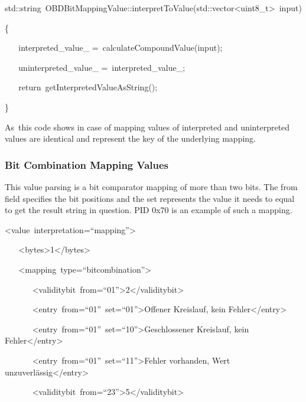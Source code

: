 {std}{::}{string}{~}{OBDBitMappingValue}{::}{interpretToValue}{(}{std}{::}{vector}{\textless{}uint8\_t\textgreater{}}{~input)}

{\{}

{~ ~ interpreted\_value\_ }{=}{~calculateCompoundValue}{(}{input}{);}

{~ ~ uninterpreted\_value\_ }{=}{~interpreted\_value\_;}

{~ ~ }{return}{~getInterpretedValueAsString}{();}

{\}}

{As}{~this code shows in case of mapping values of interpreted and
uninterpreted values are identic}{al and represent the key of the
underlying mapping.}

\hypertarget{h.v3wlh8gjmo1s}{\subsubsection{\texorpdfstring{{Bit
Combination Mapping
Values}}{Bit Combination Mapping Values}}\label{h.v3wlh8gjmo1s}}

{This value parsing is a bit comparator mapping of more than two bits.
The from field specifies the bit positions and the set represents the
value it needs to equal to get the result string in question. PID 0x70
is an example of such a mapping.}

{\textless{}value}{~}{interpretation}{=}{``mapping''\textgreater{}}

{~ ~
}{\textless{}bytes\textgreater{}}{1}{\textless{}/bytes\textgreater{}}

{~ ~ }{\textless{}mapping}{~}{type}{=}{``bitcombination''\textgreater{}}

{~ ~ ~ ~
}{\textless{}validitybit}{~}{from}{=}{``01''}{\textgreater{}}{2}{\textless{}/validitybit\textgreater{}}

{~ ~ ~ ~
}{\textless{}entry}{~}{from}{=}{``01''}{~}{set}{=}{``01''}{\textgreater{}}{Offener
Kreislauf, kein Fehler}{\textless{}/entry\textgreater{}}

{~ ~ ~ ~
}{\textless{}entry}{~}{from}{=}{``01''}{~}{set}{=}{``10''}{\textgreater{}}{Geschlossener
Kreislauf, kein Fehler}{\textless{}/entry\textgreater{}}

{~ ~ ~ ~
}{\textless{}entry}{~}{from}{=}{``01''}{~}{set}{=}{``11''}{\textgreater{}}{Fehler
vorhanden, Wert unzuverlässig}{\textless{}/entry\textgreater{}}

{~ ~ ~ ~
}{\textless{}validitybit}{~}{from}{=}{``23''}{\textgreater{}}{5}{\textless{}/validitybit\textgreater{}}

